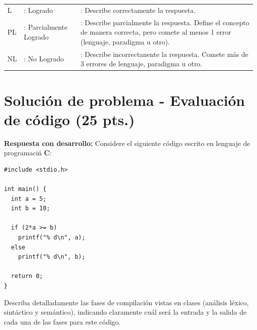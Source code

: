 \documentclass{exam}
\begin{document}
\begin{table}[H]
    {\small
    \begin{tabular}{lll}
        L  & : Logrado    & : Describe correctamente la respuesta. \\
        PL  & : Parcialmente Logrado & : Describe parcialmente la respuesta. Define el concepto de manera correcta, pero comete al menos 1 error (lenguaje, paradigma u otro).  \\
        NL & : No Logrado & : Describe incorrectanente la respuesta. Comete más de 3 errores de lenguaje, paradigma u otro. \\
    \end{tabular}}
\end{table}

\clearpage

\vspace{-7mm}
\section{\textbf{Soluci\'on de problema - Evaluaci\'on de c\'odigo (25 pts.)}}

\noindent
\textbf{Respuesta con desarrollo:} Considere el siguiente c\'odigo escrito en lenguaje de programaci\'n \textbf{C}:
    
\begin{lstlisting}[style=CStyle]
#include <stdio.h>

int main() {
  int a = 5;
  int b = 10;
  
  if (2*a >= b)
    printf("% d\n", a);
  else 
    printf("% d\n", b);

  return 0;
}
\end{lstlisting}

\noindent
Describa detalladamente las fases de compilaci\'on vistas en clases (an\'alisis l\'exico, sint\'actico y sem\'antico), indicando claramente cu\'al ser\'a la entrada y la salida de cada una de las fases para este c\'odigo. 
\end{document}
